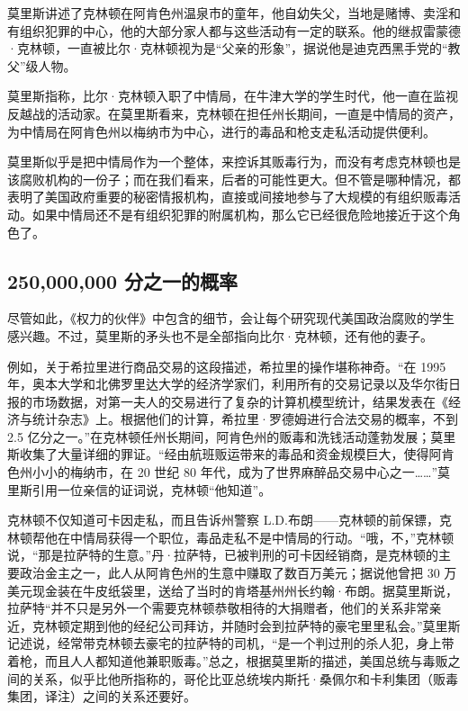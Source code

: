 莫里斯讲述了克林顿在阿肯色州温泉市的童年，他自幼失父，当地是赌博、卖淫和有组织犯罪的中心，他的大部分家人都与这些活动有一定的联系。他的继叔雷蒙德·克林顿，一直被比尔·克林顿视为是“父亲的形象”，据说他是迪克西黑手党的“教父”级人物。

莫里斯指称，比尔·克林顿入职了中情局，在牛津大学的学生时代，他一直在监视反越战的活动家。在莫里斯看来，克林顿在担任州长期间，一直是中情局的资产，为中情局在阿肯色州以梅纳市为中心，进行的毒品和枪支走私活动提供便利。

莫里斯似乎是把中情局作为一个整体，来控诉其贩毒行为，而没有考虑克林顿也是该腐败机构的一份子；而在我们看来，后者的可能性更大。但不管是哪种情况，都表明了美国政府重要的秘密情报机构，直接或间接地参与了大规模的有组织贩毒活动。如果中情局还不是有组织犯罪的附属机构，那么它已经很危险地接近于这个角色了。

\subsection{250,000,000 分之一的概率}
尽管如此，《权力的伙伴》中包含的细节，会让每个研究现代美国政治腐败的学生感兴趣。不过，莫里斯的矛头也不是全部指向比尔·克林顿，还有他的妻子。

例如，关于希拉里进行商品交易的这段描述，希拉里的操作堪称神奇。“在 1995年，奥本大学和北佛罗里达大学的经济学家们，利用所有的交易记录以及华尔街日报的市场数据，对第一夫人的交易进行了复杂的计算机模型统计，结果发表在《经济与统计杂志》上。根据他们的计算，希拉里·罗德姆进行合法交易的概率，不到 2.5 亿分之一。”在克林顿任州长期间，阿肯色州的贩毒和洗钱活动蓬勃发展；莫里斯收集了大量详细的罪证。“经由航班贩运带来的毒品和资金规模巨大，使得阿肯色州小小的梅纳市，在 20 世纪 80 年代，成为了世界麻醉品交易中心之一……”莫里斯引用一位亲信的证词说，克林顿“他知道”。

克林顿不仅知道可卡因走私，而且告诉州警察 L.D.布朗——克林顿的前保镖，克林顿帮他在中情局获得一个职位，毒品走私不是中情局的行动。“哦，不，”克林顿说，“那是拉萨特的生意。”丹·拉萨特，已被判刑的可卡因经销商，是克林顿的主要政治金主之一，此人从阿肯色州的生意中赚取了数百万美元；据说他曾把 30 万美元现金装在牛皮纸袋里，送给了当时的肯塔基州州长约翰·布朗。据莫里斯说，拉萨特“并不只是另外一个需要克林顿恭敬相待的大捐赠者，他们的关系非常亲近，克林顿定期到他的经纪公司拜访，并随时会到拉萨特的豪宅里里私会。”莫里斯记述说，经常带克林顿去豪宅的拉萨特的司机，“是一个判过刑的杀人犯，身上带着枪，而且人人都知道他兼职贩毒。”总之，根据莫里斯的描述，美国总统与毒贩之间的关系，似乎比他所指称的，哥伦比亚总统埃内斯托·桑佩尔和卡利集团（贩毒集团，译注）之间的关系还要好。

